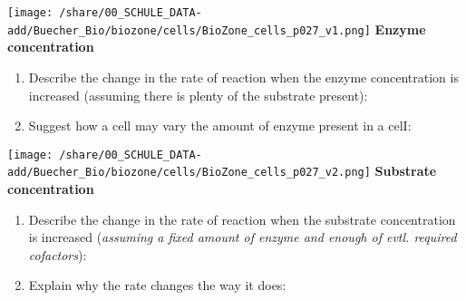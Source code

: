 \begin{enumerate}[itemsep=1.5em, leftmargin=*]
	\enlargethispage{2cm}
\begin{minipage}{15cm}
\begin{multicols*}{2}
		\texttt{[image: /share/00\_SCHULE\_DATA-add/Buecher\_Bio/biozone/cells/BioZone\_cells\_p027\_v1.png]}
	\vfill\null
	\columnbreak
		 \textbf{Enzyme concentration}
	 		\begin{enumerate}[label=\textit{(\arabic*)},leftmargin=0em,series=zaehler]
		      \item Describe the change in the rate of reaction when the enzyme concentration is increased (assuming there is plenty of the substrate present):
		      \item  Suggest how a cell may vary the amount of enzyme present in a celI: 
		      \end{enumerate}
	\end{multicols*}
\end{minipage}

\begin{minipage}{15cm}
\begin{multicols*}{2}
		\texttt{[image: /share/00\_SCHULE\_DATA-add/Buecher\_Bio/biozone/cells/BioZone\_cells\_p027\_v2.png]}
	\vfill\null
	\columnbreak
			 \textbf{Substrate concentration}
	 		\begin{enumerate}[label=\textit{(\arabic*)},leftmargin=0em,series=zaehler]
		      \item  Describe the change in the rate of reaction when the substrate concentration is increased (\textit{assuming a fixed amount of enzyme and enough of evtl. required cofactors}):
		      \item  Explain why the rate changes the way it does:
		      \end{enumerate}
	\end{multicols*}
\end{minipage}


\end{enumerate}
